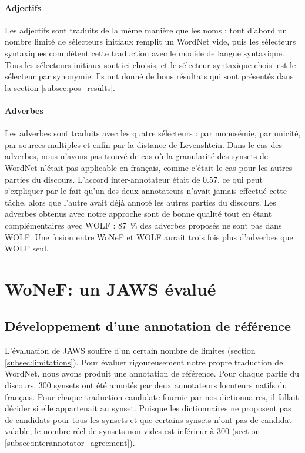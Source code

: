 \paragraph{Adjectifs} Les adjectifs sont traduits de la même manière que les
noms : tout d'abord un nombre limité de sélecteurs initiaux remplit un WordNet
vide, puis les sélecteurs syntaxiques complètent cette traduction avec le
modèle de langue syntaxique. Tous les sélecteurs initiaux sont ici choisis, et
le sélecteur syntaxique choisi est le sélecteur par synonymie. Ils ont donné de
bons résultats qui sont présentés dans la section \ref{subsec:pos_results}.

\paragraph{Adverbes} Les adverbes sont traduits avec les quatre sélecteurs :
par monosémie, par unicité, par sources multiples et enfin par la distance de
Levenshtein. Dans le cas des adverbes, nous n'avons pas trouvé de cas où la
granularité des synsets de WordNet n'était pas applicable en français, comme
c'était le cas pour les autres parties du discours. L'accord inter-annotateur
était de 0.57, ce qui peut s'expliquer par le fait qu'un des deux annotateurs
n'avait jamais effectué cette tâche, alors que l'autre avait déjà annoté les
autres parties du discours. Les adverbes obtenus avec notre approche sont de
bonne qualité tout en étant complémentaires avec WOLF : 87~\% des adverbes
proposés ne sont pas dans WOLF. Une fusion entre WoNeF et WOLF aurait trois
fois plus d'adverbes que WOLF seul.

\section{WoNeF: un JAWS évalué}
\label{sec:evaluating_jaws}

\subsection{Développement d'une annotation de référence}
\label{subsec:gold_standard}

L'évaluation de JAWS souffre d'un certain nombre de limites (section
\ref{subsec:limitations}). Pour évaluer rigoureusement notre propre traduction
de WordNet, nous avons produit une annotation de référence. Pour chaque partie
du discours, 300 synsets ont été annotés par deux annotateurs locuteurs natifs
du français. Pour chaque traduction candidate fournie par nos dictionnaires, il
fallait décider si elle appartenait au synset. Puisque les dictionnaires ne
proposent pas de candidats pour tous les synsets et que certains synsets n'ont
pas de candidat valable, le nombre réel de synsets non vides est inférieur à
300 (section \ref{subsec:interannotator_agreement}).

